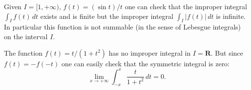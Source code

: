 \documentclass[12pt]{article}
\newcommand{\R}{\mathbf R}
\begin{document}
Given $I=[1,+\infty)$, $f(t)=(\sin t)/t$ one can check that the improper integral $\int_I f(t)\, dt$ exists and is finite but the improper integral $\int_I |f(t)|\, dt$ is infinite. In particular this function is not summable (in the sense of Lebesgue integrals) on the interval $I$.

The function $f(t)=t/(1+t^2)$ has no improper integral in $I=\R$. But since $f(t)=-f(-t)$ one can easily check that the symmetric integral is zero:
\[
  \lim_{x\to+\infty} \int_{-x}^x \frac{t}{1+t^2}\, dt =0.
\]
\end{document}
